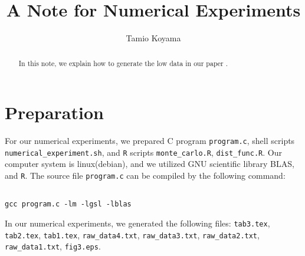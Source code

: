 \documentclass[12pt]{article}
\title{A Note for Numerical Experiments}
\author{Tamio Koyama}
\date{}
\begin{document}
\maketitle

\begin{abstract}
In this note, we explain how to generate the low data in our paper
\cite{2015koyama2}.
\end{abstract}

\section{Preparation}
For our numerical experiments, we prepared 
C program {\tt program.c}, 
shell scripts \\{\tt numerical\_experiment.sh}, 
and {\tt R} scripts {\tt monte\_carlo.R}, {\tt dist\_func.R}.
Our computer system is linux(debian), and we utilized GNU scientific library
BLAS, and {\tt R}.
The source file {\tt program.c} can be compiled by the following command:
\begin{lstlisting}[style=BashInputStyle]

gcc program.c -lm -lgsl -lblas
\end{lstlisting}

 
In our numerical experiments, we generated the following files:
{\tt tab3.tex}, 
{\tt tab2.tex}, 
{\tt tab1.tex}, 
{\tt raw\_data4.txt}, 
{\tt raw\_data3.txt}, 
{\tt raw\_data2.txt}, 
{\tt raw\_data1.txt},
{\tt fig3.eps}.
\end{document}

